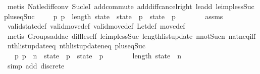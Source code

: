 \begin{isabellebody}
\ {\isacharparenleft}metis\ Nat{\isachardot}le{\isacharunderscore}diff{\isacharunderscore}conv{}\ Suc{\isacharunderscore}leI\ add{\isachardot}commute\ add{\isacharunderscore}diff{\isacharunderscore}cancel{\isacharunderscore}right{\isacharprime}\ le{\isacharunderscore}add{}\ le{\isacharunderscore}imp{\isacharunderscore}less{\isacharunderscore}Suc\ plus{\isacharunderscore}{}{\isacharunderscore}eq{\isacharunderscore}Suc{\isacharparenright}\isanewline
\isanewline
\ \ \isamarkupfalse%
\ {\isachardoublequoteopen}{\isasymexists}{\isacharbang}\ p{}{\isachardot}\ p{}\ {\isacharless}\ length\ state\ {\isasymand}\ state{\isacharprime}\ {\isacharbang}\ p{}\ {\isacharequal}\ state\ {\isacharbang}\ p{}\ {\isacharplus}\ {}{\isachardoublequoteclose}\isanewline
\ \ \ \ \isamarkupfalse%
\ assms\isanewline
\ \ \ \ \isamarkupfalse%
\ valid{\isacharunderscore}state{\isacharunderscore}def\ valid{\isacharunderscore}move{\isacharunderscore}def\ valid{\isacharunderscore}move{\isacharprime}{\isacharunderscore}def\ Let{\isacharunderscore}def\ move{\isacharunderscore}def\isanewline
\ \ \ \ \isamarkupfalse%
\ {\isacharparenleft}metis\ Groups{\isachardot}add{\isacharunderscore}ac{\isacharparenleft}{}{\isacharparenright}\ diff{\isacharunderscore}le{\isacharunderscore}self\ le{\isacharunderscore}imp{\isacharunderscore}less{\isacharunderscore}Suc\ length{\isacharunderscore}list{\isacharunderscore}update\ n{\isacharunderscore}not{\isacharunderscore}Suc{\isacharunderscore}n\ nat{\isacharunderscore}neq{\isacharunderscore}iff\ nth{\isacharunderscore}list{\isacharunderscore}update{\isacharunderscore}eq\ nth{\isacharunderscore}list{\isacharunderscore}update{\isacharunderscore}neq\ plus{\isacharunderscore}{}{\isacharunderscore}eq{\isacharunderscore}Suc{\isacharparenright}\isanewline
\ \ \isamarkupfalse%
\ {\isacharasterisk}{\isacharasterisk}{\isacharcolon}\ {\isachardoublequoteopen}{\isasymexists}{\isacharbang}\ p{}{\isachardot}\ p{}\ {\isasymle}\ n\ {\isasymand}\ state{\isacharprime}\ {\isacharbang}\ p{}\ {\isacharequal}\ state\ {\isacharbang}\ p{}\ {\isacharplus}\ {}{\isachardoublequoteclose}\isanewline
\ \ \ \ \isamarkupfalse%
\ {\isacharbackquoteopen}length\ state\ {\isacharequal}\ n\ {\isacharplus}\ {}{\isacharbackquoteclose}\isanewline
\ \ \ \ \isamarkupfalse%
\ {\isacharparenleft}simp\ add{\isacharcolon}\ discrete{\isacharparenright}\isanewline

\end{isabellebody}
